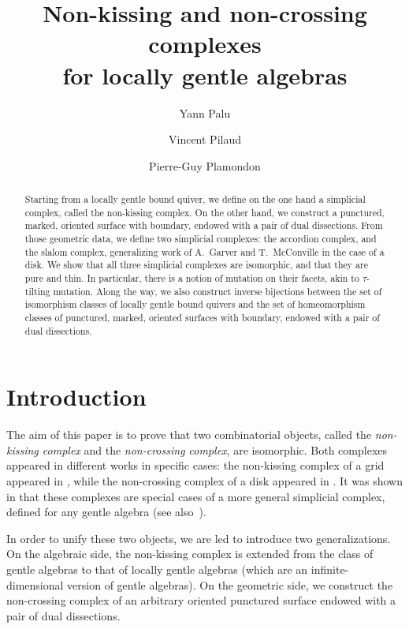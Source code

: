 \documentclass{amsart}
\title[Non-kissing and non-crossing complexes for locally gentle algebras]{Non-kissing and non-crossing complexes \\ for locally gentle algebras}
\author{Yann Palu}
\author{Vincent Pilaud}
\author{Pierre-Guy Plamondon}
\theoremstyle{definition}
\begin{document}
\begin{abstract}
Starting from a locally gentle bound quiver, we define on the one hand a simplicial complex, called the non-kissing complex.
On the other hand, we construct a punctured, marked, oriented surface with boundary, endowed with a pair of dual dissections.
From those geometric data, we define two simplicial complexes: the accordion complex, and the slalom complex, generalizing work of A.~Garver and T.~McConville in the case of a disk.
We show that all three simplicial complexes are isomorphic, and that they are pure and thin.
In particular, there is a notion of mutation on their facets, akin to $\tau$-tilting mutation.
Along the way, we also construct inverse bijections between the set of isomorphism classes of locally gentle bound quivers and the set of homeomorphism classes of punctured, marked, oriented surfaces with boundary, endowed with a pair of dual dissections.
\end{abstract}

\vspace*{-1.3cm}
\maketitle
\vspace{-.7cm}

\section{Introduction}

\enlargethispage{.1cm}
The aim of this paper is to prove that two combinatorial objects, called the \emph{non-kissing complex} and the \emph{non-crossing complex}, are isomorphic.
Both complexes appeared in different works in specific cases: the non-kissing complex of a grid appeared in \cite{McConville}, while the non-crossing complex of a disk appeared in \cite{GarverMcConville, MannevillePilaud-accordion}.
It was shown in \cite{PaluPilaudPlamondon} that these complexes are special cases of a more general simplicial complex, defined for any gentle algebra (see also~\cite{BrustleDouvilleMousavandThomasYildirim}).

In order to unify these two objects, we are led to introduce two generalizations.
On the algebraic side, the non-kissing complex is extended from the class of gentle algebras to that of locally gentle algebras (which are an infinite-dimensional version of gentle algebras).
On the geometric side, we construct the non-crossing complex of an arbitrary oriented punctured surface endowed with a pair of dual dissections.
\end{document}
